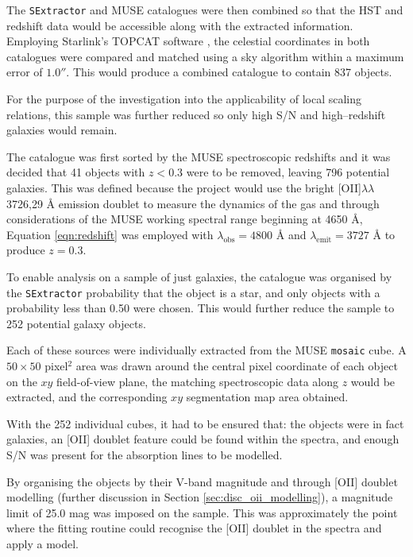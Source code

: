 \documentclass[12pt, twocolumn, nofootinbib]{revtex4-1}    %
\begin{document}
The \texttt{SExtractor} and MUSE catalogues were then combined so that the HST and redshift data would be accessible along with the extracted information. Employing Starlink's TOPCAT software \citep{2005ASPC..347...29T}, the celestial coordinates in both catalogues were compared and matched using a sky algorithm within a maximum error of $1.0''$. This would produce a combined catalogue to contain 837 objects.

For the purpose of the investigation into the applicability of local scaling relations, this sample was further reduced so only high S/N and high--redshift galaxies would remain. 

The catalogue was first sorted by the MUSE spectroscopic redshifts and it was decided that 41 objects with $z<0.3$ were to be removed, leaving 796 potential galaxies. This was defined because the project would use the bright [OII]$\lambda\lambda$3726,29 {\AA} emission doublet to measure the dynamics of the gas and through considerations of the MUSE working spectral range beginning at 4650 {\AA}, Equation \ref{eqn:redshift} was employed with $\lambda_{\text{obs}}=4800$ {\AA} and $\lambda_{\text{emit}}=3727$ {\AA} to produce $z=0.3$. 

To enable analysis on a sample of just galaxies, the catalogue was organised by the \texttt{SExtractor} probability that the object is a star, and only objects with a probability less than 0.50 were chosen. This would further reduce the sample to 252 potential galaxy objects.

Each of these sources were individually extracted from the MUSE \texttt{mosaic} cube. A $50\times 50$ pixel$^2$ area was drawn around the central pixel coordinate of each object on the $xy$ field-of-view plane, the matching spectroscopic data along $z$ would be extracted, and the corresponding $xy$ segmentation map area obtained. 

With the 252 individual cubes, it had to be ensured that: the objects were in fact galaxies, an [OII] doublet feature could be found within the spectra, and enough S/N was present for the absorption lines to be modelled.  

By organising the objects by their V-band magnitude and through [OII] doublet modelling (further discussion in Section \ref{sec:disc_oii_modelling}), a magnitude limit of 25.0 mag was imposed on the sample. This was approximately the point where the fitting routine could recognise the [OII] doublet in the spectra and apply a model.
\end{document}
